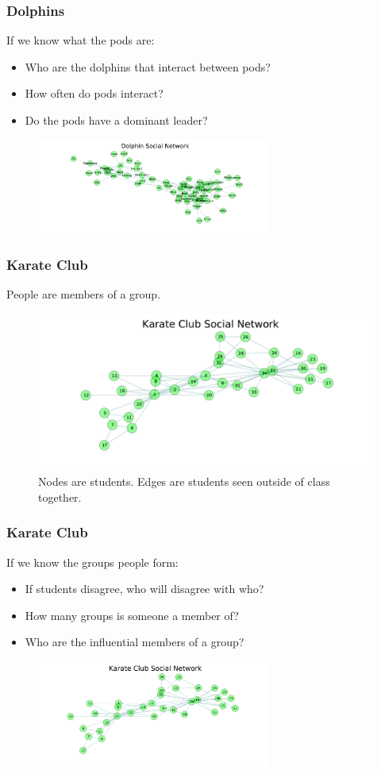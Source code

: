 \documentclass{beamer}
\begin{document}
\begin{frame}\frametitle{Dolphins}
If we know what the pods are:
\begin{itemize}
\item Who are the dolphins that interact between pods?
\item How often do pods interact?
\item Do the pods have a dominant leader?
\end{itemize}
\begin{figure}
\includegraphics[width=3in]{Figures/dolphin_social_network}
\end{figure}
\end{frame}


\begin{frame}\frametitle{Karate Club}
People are members of a group.
\begin{figure}
\includegraphics[width=4.5in]{Figures/karate_social_network}
\caption{Nodes are students.  Edges are students seen outside of class together.}
\end{figure}
\end{frame}



\begin{frame}\frametitle{Karate Club}
If we know the groups people form:
\begin{itemize}
\item If students disagree, who will disagree with who?
\item How many groups is someone a member of?
\item Who are the influential members of a group?
\end{itemize}
\begin{figure}
\includegraphics[width=3in]{Figures/karate_social_network}
\end{figure}
\end{frame}
\end{document}

